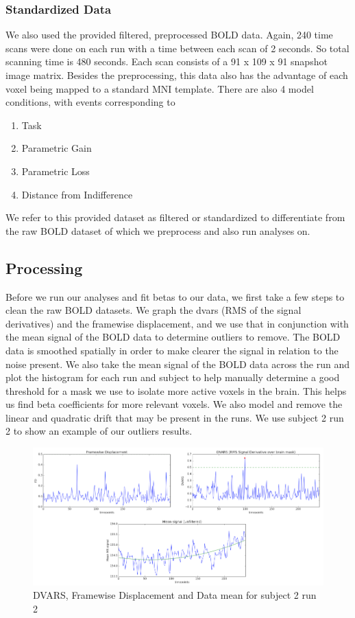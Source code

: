 \documentclass[11pt]{article}
\begin{document}
\subsubsection{Standardized Data}
We also used the provided filtered, preprocessed BOLD data. Again, 240 time scans 
were done on each run with a time between each scan of 2 seconds. So total scanning 
time is 480 seconds. Each scan consists of a 91 x 109 x 91 snapshot image
matrix. Besides the preprocessing, this data also has the advantage of each 
voxel being mapped to a standard MNI template. There are also 4 model 
conditions, with events corresponding to 
\begin{enumerate}
  \item Task
  \item Parametric Gain
  \item Parametric Loss
  \item Distance from Indifference
\end{enumerate}
We refer to this provided dataset as filtered or standardized to differentiate from the raw
BOLD dataset of which we preprocess and also run analyses on.

\subsection{Processing}
Before we run our analyses and fit betas to our data, we first take a few 
steps to clean the raw BOLD datasets. We graph the dvars (RMS of the signal 
derivatives) and the framewise displacement, and we use that in conjunction 
with the mean signal of the BOLD data to determine outliers to remove. The 
BOLD data is smoothed spatially in order to make clearer the signal in 
relation to the noise present. We also take the mean signal of the BOLD data 
across the run and plot the histogram for each run and subject to help 
manually determine a good threshold for a mask we use to isolate more active 
voxels in the brain. This helps us find beta coefficients for more relevant 
voxels. We also model and remove the linear and quadratic drift that may be 
present in the runs. 
We use subject 2 run 2 to show an example of our outliers results.

\begin{figure}[H]
    \centering
        \includegraphics[scale=0.55]{figures/processing.png}
    \caption{DVARS, Framewise Displacement and Data mean for subject 2 run 2}
\end{figure}
\end{document}
